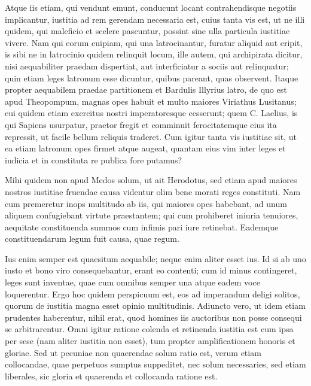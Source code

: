  Atque iis etiam, qui vendunt emunt, conducunt locant contrahendisque negotiis implicantur, iustitia ad rem gerendam necessaria est, cuius tanta vis est, ut ne illi quidem, qui maleficio et scelere pascuntur, possint sine ulla particula iustitiae vivere. Nam qui eorum cuipiam, qui una latrocinantur, furatur aliquid aut eripit, is sibi ne in latrocinio quidem relinquit locum, ille autem, qui archipirata dicitur, nisi aequabiliter praedam dispertiat, aut interficiatur a sociis aut relinquatur; quin etiam leges latronum esse dicuntur, quibus pareant, quas observent. Itaque propter aequabilem praedae partitionem et Bardulis Illyrius latro, de quo est apud Theopompum, magnas opes habuit et multo maiores Viriathus Lusitanus; cui quidem etiam exercitus nostri imperatoresque cesserunt; quem C. Laelius, is qui Sapiens usurpatur, praetor fregit et comminuit ferocitatemque eius ita repressit, ut facile bellum reliquis traderet. Cum igitur tanta vis iustitiae sit, ut ea etiam latronum opes firmet atque augeat, quantam eius vim inter leges et iudicia et in constituta re publica fore putamus?

 Mihi quidem non apud Medos solum, ut ait Herodotus, sed etiam apud maiores nostros iustitiae fruendae causa videntur olim bene morati reges constituti. Nam cum premeretur inops multitudo ab iis, qui maiores opes habebant, ad unum aliquem confugiebant virtute praestantem; qui cum prohiberet iniuria tenuiores, aequitate constituenda summos cum infimis pari iure retinebat. Eademque constituendarum legum fuit causa, quae regum.

 Ius enim semper est quaesitum aequabile; neque enim aliter esset ius. Id si ab uno iusto et bono viro consequebantur, erant eo contenti; cum id minus contingeret, leges sunt inventae, quae cum omnibus semper una atque eadem voce loquerentur. Ergo hoc quidem perspicuum est, eos ad imperandum deligi solitos, quorum de iustitia magna esset opinio multitudinis. Adiuncto vero, ut idem etiam prudentes haberentur, nihil erat, quod homines iis auctoribus non posse consequi se arbitrarentur. Omni igitur ratione colenda et retinenda iustitia est cum ipsa per sese (nam aliter iustitia non esset), tum propter amplificationem honoris et gloriae. Sed ut pecuniae non quaerendae solum ratio est, verum etiam collocandae, quae perpetuos sumptus suppeditet, nec solum necessaries, sed etiam liberales, sic gloria et quaerenda et collocanda ratione est.

